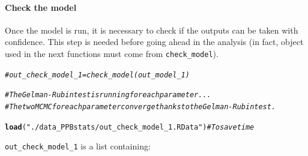 \documentclass{article}\usepackage[]{graphicx}\usepackage[]{color}
\makeatletter
\newcommand{\hlstr}[1]{\textcolor[rgb]{0.192,0.494,0.8}{#1}}%
\newcommand{\hlcom}[1]{\textcolor[rgb]{0.678,0.584,0.686}{\textit{#1}}}%
\newcommand{\hlstd}[1]{\textcolor[rgb]{0.345,0.345,0.345}{#1}}%
\newcommand{\hlkwd}[1]{\textcolor[rgb]{0.737,0.353,0.396}{\textbf{#1}}}%
\newenvironment{kframe}{%
 \def\at@end@of@kframe{}%
 \ifinner\ifhmode%
  \def\at@end@of@kframe{\end{minipage}}%
  \begin{minipage}{\columnwidth}%
 \fi\fi%
 \def\FrameCommand##1{\hskip\@totalleftmargin \hskip-\fboxsep
 \colorbox{shadecolor}{##1}\hskip-\fboxsep
     \hskip-\linewidth \hskip-\@totalleftmargin \hskip\columnwidth}%
 \MakeFramed {\advance\hsize-\width
   \@totalleftmargin\z@ \linewidth\hsize
   \@setminipage}}%
 {\par\unskip\endMakeFramed%
 \at@end@of@kframe}
\newenvironment{knitrout}{}{} %
\makeatother
\begin{document}
\paragraph{Check the model}

Once the model is run, it is necessary to check if the outputs can be taken with confidence.
This step is needed before going ahead in the analysis (in fact, object used in the next functions must come from \texttt{check\_model}).

\begin{knitrout}
\color{fgcolor}\begin{kframe}
\begin{alltt}
\hlcom{# out_check_model_1 = check_model(out_model_1)}

\hlcom{# The Gelman-Rubin test is running for each parameter ...}
\hlcom{# The two MCMC for each parameter converge thanks to the Gelman-Rubin test.}

\hlkwd{load}\hlstd{(}\hlstr{"./data_PPBstats/out_check_model_1.RData"}\hlstd{)} \hlcom{# To save time}
\end{alltt}
\end{kframe}
\end{knitrout}

\texttt{out\_check\_model\_1} is a list containing:
\end{document}

